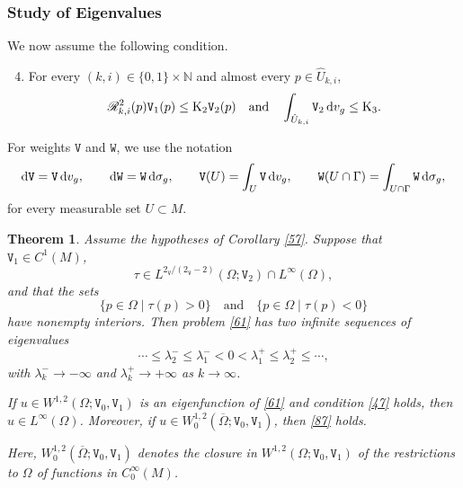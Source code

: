 \documentclass[reqno, 11pt, a4paper]{amsart}
\newtheorem{theorem}{Theorem}[section]
\numberwithin{equation}{section}
\newcommand{\dvg}{\textnormal{d}v_g}
\newcommand{\dsg}{\textnormal{d}\sigma _g}
\newcommand{\iwe}{ \tau}
\newcommand{\xv}{2_{\mathtt{V}}}
\newcommand{\xw}{2_{\mathtt{W}}}
\newcommand{\qxv}{q_{\mathtt{V}}}
\newcommand{\qxw}{q_{\mathtt{W}}}
\newcommand{\ck}{\textnormal K}
\newcommand{\womd}{W^{1,2} (\Omega ; \mathtt{V} _0 , \mathtt{V} _1)}
\newcommand{\wghtv}{\mathtt{V}}
\newcommand{\wghtw}{\mathtt{W}}
\newcommand{\dwv}{\textnormal{d} \mathtt{V}}
\newcommand{\dww}{\textnormal{d} \mathtt{W}}
\newcommand{\kp}{\mathscr{R}}
\newcommand{\pvr}{p}
\begin{document}











\subsubsection{Study of Eigenvalues} We now assume the following condition.
\begin{enumerate}[label=($\mathtt{W}_{\arabic*}$)]
\setcounter{enumi}{3}
\item \label{47} For every \((k,i)\in\{0,1\}\times\mathbb N\) and almost every \(\pvr\in\hat U_{k,i}\),
\[
{
\kp_{k,i}^{2}(\pvr)\wghtv_1(\pvr)
\leq\ck_2\wghtv_2(\pvr)
}
\quad\text{and}\quad
\int_{\hat U_{k,i}}\wghtv_2\,\dvg\leq\ck_3.
\]
\end{enumerate}



For weights \(\wghtv\) and \(\wghtw\), we use the notation
\[
\dwv=\wghtv\,\dvg,
\qquad
\dww=\wghtw\,\dsg,
\qquad
\wghtv(U)=\int_U\wghtv\,\dvg,
\qquad
\wghtw(U\cap\Gamma)=\int_{U\cap\Gamma}\wghtw\,\dsg,
\]
for every measurable set \(U\subset M\).


\begin{theorem}\label{59}
Assume the hypotheses of Corollary \ref{57}. Suppose that \(\wghtv_1\in C^1(M)\),
\[
\iwe\in L^{\xv/(\xv-2)}(\Omega;\wghtv_2)\cap L^\infty(\Omega),
\]
and that the sets
\[
\{\pvr\in\Omega\mid\iwe(\pvr)>0\}
\quad\text{and}\quad
\{\pvr\in\Omega\mid\iwe(\pvr)<0\}
\]
have nonempty interiors. Then problem \eqref{61} has two infinite sequences of eigenvalues
\[
\cdots\leq\lambda_2^-\leq\lambda_1^-<0<\lambda_1^+\leq\lambda_2^+\leq\cdots,
\]
{with \(\lambda_k^-\rightarrow-\infty\) and \(\lambda_k^+\rightarrow+\infty\) as \(k\rightarrow\infty\).}

If \(u\in\womd\) is an eigenfunction of \eqref{61} and condition \ref{47} holds, then \(u\in L^\infty(\Omega)\). Moreover, if \(u\in W_0^{1,2}(\overline\Omega;\wghtv_0,\wghtv_1)\), then \eqref{87} holds.

{Here, \(W_0^{1,2}(\overline\Omega;\wghtv_0,\wghtv_1)\) denotes the closure in \(W^{1,2}(\Omega;\wghtv_0,\wghtv_1)\) of the restrictions to \(\Omega\) of functions in \(C_0^\infty(M)\).}
\end{theorem}
\end{document}

